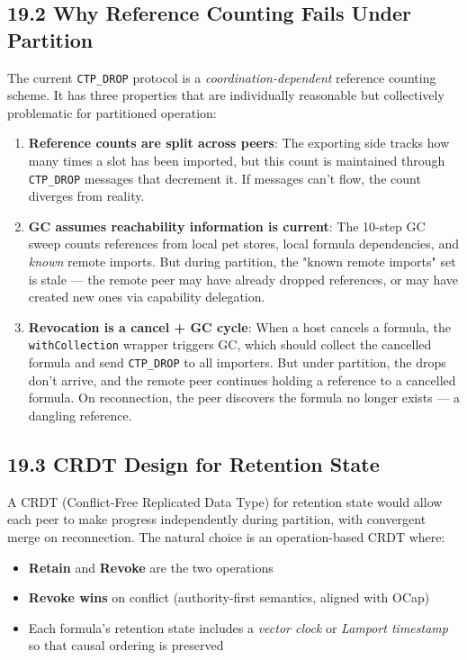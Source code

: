 \documentclass[11pt]{article}
\begin{document}
\subsection{19.2 Why Reference Counting Fails Under Partition}
\label{sec:orgabee685}

The current \texttt{CTP\_DROP} protocol is a \emph{coordination-dependent} reference
counting scheme. It has three properties that are individually reasonable
but collectively problematic for partitioned operation:

\begin{enumerate}
\item \textbf{Reference counts are split across peers}: The exporting side tracks
how many times a slot has been imported, but this count is maintained
through \texttt{CTP\_DROP} messages that decrement it. If messages can't flow,
the count diverges from reality.

\item \textbf{GC assumes reachability information is current}: The 10-step GC sweep
counts references from local pet stores, local formula dependencies, and
\emph{known} remote imports. But during partition, the "known remote imports"
set is stale --- the remote peer may have already dropped references, or
may have created new ones via capability delegation.

\item \textbf{Revocation is a cancel + GC cycle}: When a host cancels a formula, the
\texttt{withCollection} wrapper triggers GC, which should collect the cancelled
formula and send \texttt{CTP\_DROP} to all importers. But under partition, the
drops don't arrive, and the remote peer continues holding a reference to
a cancelled formula. On reconnection, the peer discovers the formula no
longer exists --- a dangling reference.
\end{enumerate}
\subsection{19.3 CRDT Design for Retention State}
\label{sec:orgc9c93fc}

A CRDT (Conflict-Free Replicated Data Type) for retention state would allow
each peer to make progress independently during partition, with convergent
merge on reconnection. The natural choice is an operation-based CRDT where:

\begin{itemize}
\item \textbf{Retain} and \textbf{Revoke} are the two operations
\item \textbf{Revoke wins} on conflict (authority-first semantics, aligned with OCap)
\item Each formula's retention state includes a \emph{vector clock} or \emph{Lamport
timestamp} so that causal ordering is preserved
\end{itemize}
\end{document}
